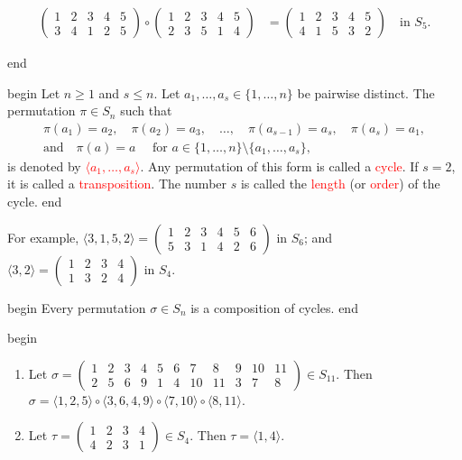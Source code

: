 \documentclass[
  12pt,
  a4paper,
  twoside]{article}
\theoremstyle{plain}
\theoremstyle{definition}
\begin{document}
\begin{enumerate}
\begin{align*}
  \begin{pmatrix}1&2&3&4&5\\3&4&1&2&5\end{pmatrix}\circ
  \begin{pmatrix}1&2&3&4&5\\2&3&5&1&4\end{pmatrix} &=
  \begin{pmatrix}1&2&3&4&5\\4&1&5&3&2\end{pmatrix}\quad\text{in }S_5.
  \end{align*}
\end{enumerate}

\csname end

\csname begin\label{cnj:defn-cycle-notation}
Let \(n\geq 1\) and \(s\leq n\). Let \(a_1, \dots, a_s\in\{1,\dots,n\}\) be pairwise distinct. The permutation \(\pi\in S_n\) such that
\begin{gather*}
\pi(a_1)=a_2,\quad \pi(a_2)=a_3,\quad \dots,\quad \pi(a_{s-1})=a_s,\quad \pi(a_s) = a_1,\\
\text{and}\quad \pi(a) = a \quad\text{ for }a\in\{1,\dots,n\}\setminus\{a_1,\dots,a_s\},
\end{gather*}
is denoted by \textcolor{red}{$\langle a_1,\dots,a_s\rangle$}. Any permutation of this form is called a \textcolor{red}{cycle}.
If \(s=2\), it is called a \textcolor{red}{transposition}. The number \(s\) is called the \textcolor{red}{length} (or \textcolor{red}{order}) of the cycle.
\csname end

For example, \(\langle 3,1,5,2\rangle=\begin{pmatrix}1&2&3&4&5&6\\5&3&1&4&2&6\end{pmatrix}\) in \(S_6\); and \(\langle 3,2\rangle = \begin{pmatrix}1&2&3&4\\1&3&2&4\end{pmatrix}\) in \(S_4\).

\csname begin\label{cnj:prop-perms-are-comps-of-cycles}
Every permutation \(\sigma\in S_n\) is a composition of cycles.
\csname end

\csname begin\label{cnj:exam-perm-into-cycles}

\begin{enumerate}
\def\labelenumi{(\alph{enumi})}
\item
  Let \(\sigma=\left(\begin{array}{ccccccccccc}1&2&3&4&5&6&7&8&9&10&11\\ 2&5&6&9&1&4&10&11&3&7&8\end{array}\right)\in S_{11}\). Then
  \(\sigma = \langle 1,2,5\rangle\circ \langle 3,6,4,9\rangle \circ \langle 7,10\rangle\circ\langle 8,11\rangle\).
\item
  Let \(\tau=\begin{pmatrix}1&2&3&4\\ 4&2&3&1\end{pmatrix}\in S_4\). Then \(\tau=\langle 1,4\rangle\).
\end{enumerate}
\end{document}
